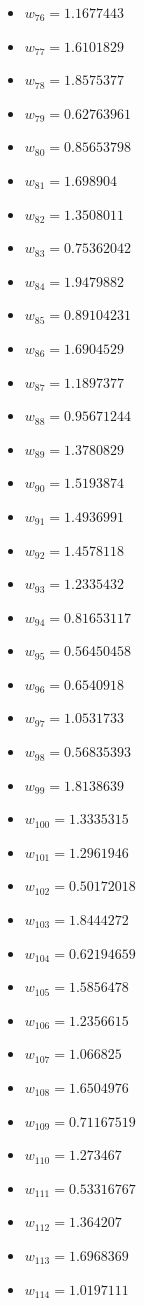 \documentclass[11pt]{article}
\begin{document}
\begin{itemize}
\item $w_{76} = 1.1677443$
\item $w_{77} = 1.6101829$
\item $w_{78} = 1.8575377$
\item $w_{79} = 0.62763961$
\item $w_{80} = 0.85653798$
\item $w_{81} = 1.698904$
\item $w_{82} = 1.3508011$
\item $w_{83} = 0.75362042$
\item $w_{84} = 1.9479882$
\item $w_{85} = 0.89104231$
\item $w_{86} = 1.6904529$
\item $w_{87} = 1.1897377$
\item $w_{88} = 0.95671244$
\item $w_{89} = 1.3780829$
\item $w_{90} = 1.5193874$
\item $w_{91} = 1.4936991$
\item $w_{92} = 1.4578118$
\item $w_{93} = 1.2335432$
\item $w_{94} = 0.81653117$
\item $w_{95} = 0.56450458$
\item $w_{96} = 0.6540918$
\item $w_{97} = 1.0531733$
\item $w_{98} = 0.56835393$
\item $w_{99} = 1.8138639$
\item $w_{100} = 1.3335315$
\item $w_{101} = 1.2961946$
\item $w_{102} = 0.50172018$
\item $w_{103} = 1.8444272$
\item $w_{104} = 0.62194659$
\item $w_{105} = 1.5856478$
\item $w_{106} = 1.2356615$
\item $w_{107} = 1.066825$
\item $w_{108} = 1.6504976$
\item $w_{109} = 0.71167519$
\item $w_{110} = 1.273467$
\item $w_{111} = 0.53316767$
\item $w_{112} = 1.364207$
\item $w_{113} = 1.6968369$
\item $w_{114} = 1.0197111$

\end{itemize}
\end{document}

